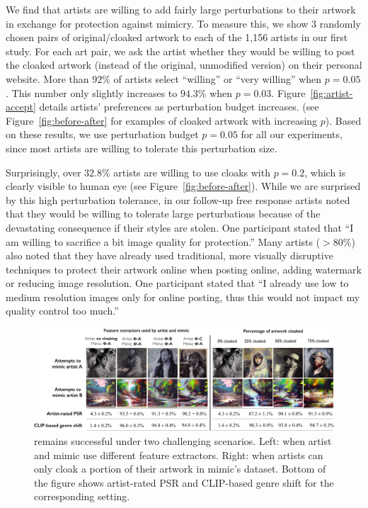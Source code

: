 We find that artists are willing to add fairly large \system{} perturbations
to their artwork in exchange for protection against mimicry. To measure this,
we show $3$ randomly chosen pairs of original/cloaked artwork to each of the
1,156 artists in our first study. For each art pair, we ask the artist
whether they would be willing to post the cloaked artwork (instead of the
original, unmodified version) on their personal website. More than $92\%$ of
artists select ``willing'' or ``very willing'' when $p=0.05$. This number
only slightly increases to $94.3\%$  when $p=0.03$.
Figure~\ref{fig:artist-accept} details artists' preferences as perturbation
budget increases. (see Figure~\ref{fig:before-after} for examples of cloaked
artwork with increasing $p$). Based on these results, we use perturbation
budget $p = 0.05$ for all our experiments, since most artists are willing to
tolerate this perturbation size.  

Surprisingly, over $32.8\%$ artists are willing to use cloaks with $p=0.2$,
which is clearly visible to human eye (see Figure~\ref{fig:before-after}). While we
are surprised by this high perturbation tolerance, in our follow-up free
response artists noted that they would be willing to tolerate large
perturbations because of the devastating consequence if their styles are
stolen. One participant stated that ``I am willing to sacrifice a bit image
quality for protection.'' Many artists ($>80\%$) also noted that they have
already used traditional, more visually disruptive techniques to protect
their artwork online when posting online, \ie adding watermark or reducing
image resolution. One participant stated that ``I already use low to medium
resolution images only for online posting, thus this would not impact my
quality control too much.'' 

\begin{figure}[t]
  \centering
  \includegraphics[width=0.95\linewidth]{plots/eval/eval-robust.pdf}
  \caption{\system{} remains successful under two challenging
    scenarios. Left: when artist and mimic use different feature
    extractors. Right: when artists can only cloak a portion of their artwork
    in mimic's dataset. Bottom of the figure shows artist-rated PSR and
    CLIP-based genre shift for the corresponding setting. } 
  \label{fig:core-robust}
\end{figure}

